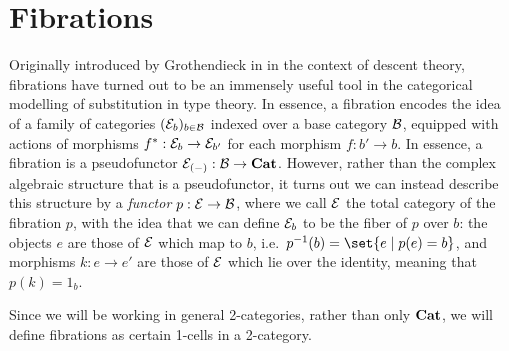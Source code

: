 \documentclass[../thesis.tex]{subfiles}
\begin{document}
  \section{Fibrations}
  Originally introduced by Grothendieck in \cite{grothendieck1960} in the context of descent theory, fibrations
  have turned out to be an immensely useful tool in the categorical modelling of substitution in type theory.
  In essence, a fibration encodes the idea of a family of categories $({\mathcal{E}}_b)_{b \in {\mathcal{B}}}$ indexed over a base
  category ${\mathcal{B}}$, equipped with actions of morphisms $f^* : {\mathcal{E}}_b \to {\mathcal{E}}_{b'}$ for each morphism $f : b' \to
  b$. In essence, a fibration is a pseudofunctor ${\mathcal{E}}_{(-)} : {\mathcal{B}} \to {\mathbf{Cat}}$. However, rather than the complex
  algebraic structure that is a pseudofunctor, it turns out we can instead describe this structure by
  a \emph{functor} $p : {\mathcal{E}} \to {\mathcal{B}}$, where we call ${\mathcal{E}}$ the total category of the fibration $p$, with
  the idea that we can define ${\mathcal{E}}_{b}$ to be the fiber of $p$ over $b$: the objects $e$ are those of ${\mathcal{E}}$
  which map to $b$, i.e.\ $p^{-1}(b) = \set{e \given p(e) = b}$, and morphisms $k : e \to e'$ are those of
  ${\mathcal{E}}$ which lie over the identity, meaning that $p(k) = 1_b$.

  Since we will be working in general 2-categories, rather than only ${\mathbf{Cat}}$, we will define fibrations as
  certain 1-cells in a 2-category. 
\end{document}
